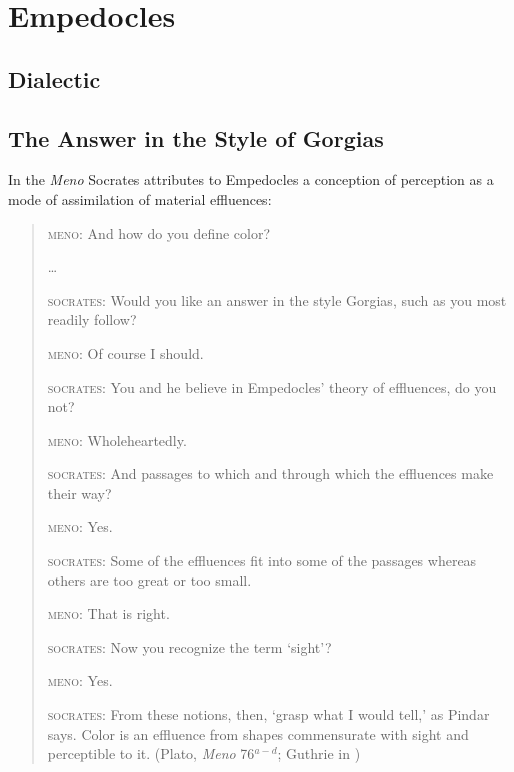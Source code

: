\chapter{Empedocles} %
\label{cha:empedocles}

\section{Dialectic} %
\label{sec:dialectic}


\section{The Answer in the Style of Gorgias} %
\label{sec:the_answer_in_the_style_of_gorgias}

In the \emph{Meno} Socrates attributes to Empedocles a conception of perception as a mode of assimilation of material effluences:
\begin{quotation}
    \textsc{meno}: And how do you define color?
    
    \ldots
    
    \textsc{socrates}: Would you like an answer in the style Gorgias, such as you most readily follow?
    
    \textsc{meno}: Of course I should.
    
    \textsc{socrates}: You and he believe in Empedocles' theory of effluences, do you not?
    
    \textsc{meno}: Wholeheartedly.
    
    \textsc{socrates}: And passages to which and through which the effluences make their way?
    
    \textsc{meno}: Yes.
    
    \textsc{socrates}: Some of the effluences fit into some of the passages whereas others are too great or too small.
    
    \textsc{meno}: That is right.
    
    \textsc{socrates}: Now you recognize the term `sight'?
    
    \textsc{meno}: Yes.
    
    \textsc{socrates}: From these notions, then, `grasp what I would tell,' as Pindar says. Color is an effluence from shapes commensurate with sight and perceptible to it. (Plato, \emph{Meno} 76\( ^{a-d} \); Guthrie in \citealt[359]{Hamilton:1989fk})
\end{quotation}

